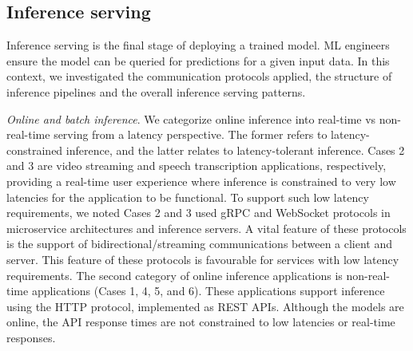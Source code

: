 



\subsection{Inference serving}
Inference serving is the final stage of deploying a trained model. ML engineers ensure the model can be queried for predictions for a given input data. In this context, we investigated the communication protocols applied, the structure of inference pipelines and the overall inference %
serving patterns.

\textit{Online and batch inference}. We categorize online inference into real-time vs non-real-time serving from a latency perspective. The former refers to latency-constrained inference, and the latter relates to latency-tolerant inference. Cases 2 and 3 are video streaming and speech transcription applications, respectively, providing a real-time user experience where inference is constrained to very low latencies for the application to be functional. To support such low latency requirements, we noted Cases 2 and 3 used gRPC and WebSocket protocols in microservice architectures and inference servers. A vital feature of these protocols is the support of bidirectional/streaming communications between a client and server. This feature of these protocols is favourable for services with low latency requirements. The second category of online inference applications is non-real-time applications (Cases 1, 4, 5, and 6). These applications support inference using the HTTP protocol, implemented as REST APIs. Although the models are online, the API response times are not constrained to low latencies or real-time responses.

